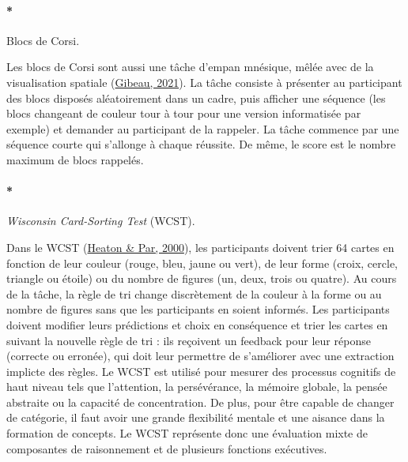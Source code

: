 \documentclass[
  12pt,
]{article}
\let\oldparagraph\paragraph
\renewcommand{\paragraph}[1]{\oldparagraph{#1}\mbox{}}
\begin{document}
\hypertarget{blocs-de-corsi.}{%
\paragraph*{Blocs de Corsi.}\label{blocs-de-corsi.}}

Les blocs de Corsi sont aussi une tâche d'empan mnésique, mêlée avec de
la visualisation spatiale
(\protect\hyperlink{ref-gibeauCorsiBlocksTask2021}{Gibeau, 2021}). La
tâche consiste à présenter au participant des blocs disposés
aléatoirement dans un cadre, puis afficher une séquence (les blocs
changeant de couleur tour à tour pour une version informatisée par
exemple) et demander au participant de la rappeler. La tâche commence
par une séquence courte qui s'allonge à chaque réussite. De même, le
score est le nombre maximum de blocs rappelés.

\hypertarget{wisconsin-card-sorting-test-wcst.}{%
\paragraph*{\texorpdfstring{\emph{Wisconsin Card-Sorting Test}
(WCST).}{Wisconsin Card-Sorting Test (WCST).}}\label{wisconsin-card-sorting-test-wcst.}}

Dans le WCST
(\protect\hyperlink{ref-heatonWCST64ComputerVersion2000}{Heaton \& Par,
2000}), les participants doivent trier 64 cartes en fonction de leur
couleur (rouge, bleu, jaune ou vert), de leur forme (croix, cercle,
triangle ou étoile) ou du nombre de figures (un, deux, trois ou quatre).
Au cours de la tâche, la règle de tri change discrètement de la couleur
à la forme ou au nombre de figures sans que les participants en soient
informés. Les participants doivent modifier leurs prédictions et choix
en conséquence et trier les cartes en suivant la nouvelle règle de tri :
ils reçoivent un feedback pour leur réponse (correcte ou erronée), qui
doit leur permettre de s'améliorer avec une extraction implicte des
règles. Le WCST est utilisé pour mesurer des processus cognitifs de haut
niveau tels que l'attention, la persévérance, la mémoire globale, la
pensée abstraite ou la capacité de concentration. De plus, pour être
capable de changer de catégorie, il faut avoir une grande flexibilité
mentale et une aisance dans la formation de concepts. Le WCST représente
donc une évaluation mixte de composantes de raisonnement et de plusieurs
fonctions exécutives.
\end{document}
